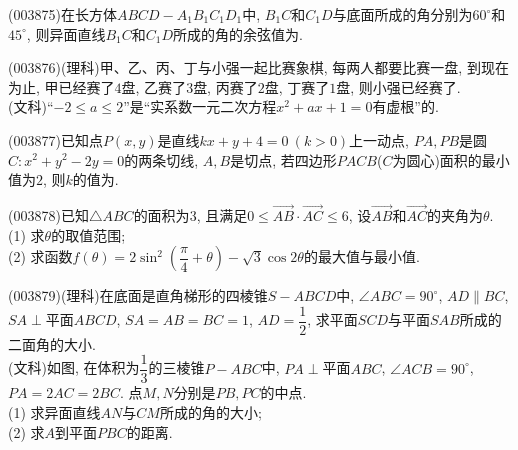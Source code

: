 \item (003875)在长方体$ABCD-A_1B_1C_1D_1$中, $B_1C$和$C_1D$与底面所成的角分别为$60^\circ$和$45^\circ$, 则异面直线$B_1C$和$C_1D$所成的角的余弦值为.
\item (003876)(理科)甲、乙、丙、丁与小强一起比赛象棋, 每两人都要比赛一盘, 到现在为止, 甲已经赛了$4$盘, 乙赛了$3$盘, 丙赛了$2$盘, 丁赛了$1$盘, 则小强已经赛了.
\\
(文科)``$-2\le a\le 2$''是``实系数一元二次方程$x^2+ax+1=0$有虚根''的.
\item (003877)已知点$P(x,y)$是直线$kx+y+4=0 \ (k>0)$上一动点, $PA,PB$是圆$C:x^2+y^2-2y=0$的两条切线, $A,B$是切点, 若四边形$PACB$($C$为圆心)面积的最小值为$2$, 则$k$的值为.
\item (003878)已知$\triangle ABC$的面积为$3$, 且满足$0\le \overrightarrow{AB}\cdot\overrightarrow{AC}\le 6$, 设$\overrightarrow{AB}$和$\overrightarrow{AC}$的夹角为$\theta$.\\
(1) 求$\theta$的取值范围;\\
(2) 求函数$f(\theta)=2\sin^2\left(\dfrac{\pi}{4}+\theta\right)-\sqrt{3}\cos 2\theta$的最大值与最小值.
\item (003879)(理科)在底面是直角梯形的四棱锥$S-ABCD$中, $\angle ABC=90^\circ$, $AD\parallel BC$, $SA\perp$平面$ABCD$, $SA=AB=BC=1$, $AD=\dfrac 12$, 求平面$SCD$与平面$SAB$所成的二面角的大小.\\
(文科)如图, 在体积为$\dfrac 13$的三棱锥$P-ABC$中, $PA\perp$平面$ABC$, $\angle ACB=90^\circ$, $PA=2AC=2BC$. 点$M,N$分别是$PB,PC$的中点.\\
(1) 求异面直线$AN$与$CM$所成的角的大小;\\
(2) 求$A$到平面$PBC$的距离.
\begin{center}
\end{center}
\begin{center}
\end{center}
